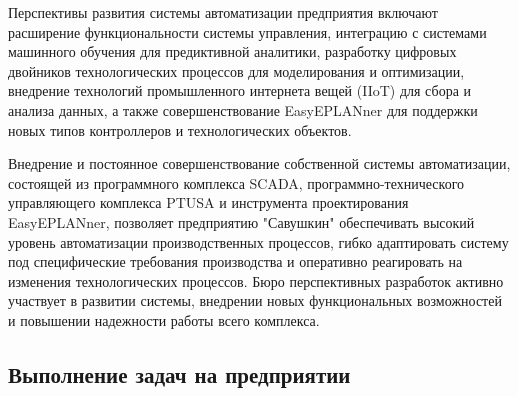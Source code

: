 {  \par \redline Перспективы развития системы автоматизации предприятия включают расширение функциональности системы управления, интеграцию с системами машинного обучения для предиктивной аналитики, разработку цифровых двойников технологических процессов для моделирования и оптимизации, внедрение технологий промышленного интернета вещей (IIoT) для сбора и анализа данных, а также совершенствование EasyEPLANner для поддержки новых типов контроллеров и технологических объектов.

  \par \redline Внедрение и постоянное совершенствование собственной системы автоматизации, состоящей из программного комплекса SCADA, программно-технического управляющего комплекса PTUSA и инструмента проектирования EasyEPLANner, позволяет предприятию "Савушкин" обеспечивать высокий уровень автоматизации производственных процессов, гибко адаптировать систему под специфические требования производства и оперативно реагировать на изменения технологических процессов. Бюро перспективных разработок активно участвует в развитии системы, внедрении новых функциональных возможностей и повышении надежности работы всего комплекса.

  \par
}

\subtitlespace

\subsection*{
  \gostTitleFont
   Выполнение задач на предприятии
} 

\subtitlespace

